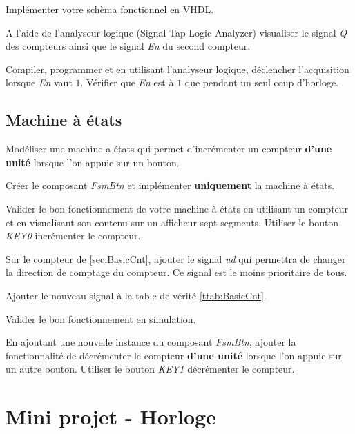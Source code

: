 \medskip

Implémenter votre schèma fonctionnel en VHDL.

\medskip

A l'aide de l'analyseur logique (Signal Tap Logic Analyzer) visualiser le signal \textit{Q} des compteurs ainsi que le signal \textit{En} du second compteur. 

\medskip

Compiler, programmer et en utilisant l'analyseur logique, déclencher l'acquisition lorsque \textit{En} vaut $1$. Vérifier que \textit{En} est à $1$ que pendant un seul coup d'horloge.


\subsection{Machine à états}
Modéliser une machine a états qui permet d'incrémenter un compteur \textbf{d'une unité} lorsque l'on appuie sur un bouton.

\medskip

Créer le composant \textit{FsmBtn} et implémenter \textbf{uniquement} la machine à états.

\medskip

Valider le bon fonctionnement de votre machine à états en utilisant un compteur et en visualisant son contenu sur un afficheur sept segments. Utiliser le bouton \textit{KEY0} incrémenter le compteur.

\medskip

Sur le compteur de \ref{sec:BasicCnt}, ajouter le signal \textit{ud} qui permettra de changer la direction de comptage du compteur. Ce signal est le moins prioritaire de tous.

\medskip

Ajouter le nouveau signal à la table de vérité \ref{ttab:BasicCnt}.

\medskip

Valider le bon fonctionnement en simulation.

\medskip

En ajoutant une nouvelle instance du composant \textit{FsmBtn}, ajouter la fonctionnalité de décrémenter le compteur \textbf{d'une unité} lorsque l'on appuie sur un autre bouton. Utiliser le bouton \textit{KEY1} décrémenter le compteur.

\section{Mini projet - Horloge}

